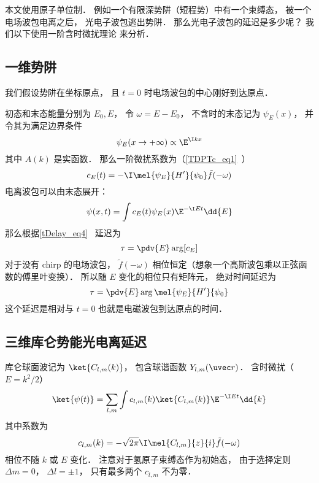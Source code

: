 
\begin{issues}
\issueDraft
\end{issues}


\begin{issues}
\issueDraft
\end{issues}


本文使用原子单位制． 例如一个有限深势阱（短程势）中有一个束缚态， 被一个电场波包电离之后， 光电子波包逃出势阱． 那么光电子波包的延迟是多少呢？ 我们以下使用一阶含时微扰理论 来分析．

\subsection{一维势阱}
我们假设势阱在坐标原点， 且 $t = 0$ 时电场波包的中心刚好到达原点．

初态和末态能量分别为 $E_0, E$， 令 $\omega = E - E_0$， 不含时的末态记为 $\psi_E(x)$， 并令其为满足边界条件
\begin{equation}\label{HeAna2_eq2}
\psi_E(x \to +\infty) \propto \E^{\I kx}
\end{equation}
其中 $A(k)$ 是实函数． 那么一阶微扰系数为（\autoref{TDPTc_eq1}~）
\begin{equation}
c_E(t) = -\I  \mel{\psi_E}{H'}{\psi_0} \tilde f(-\omega)
\end{equation}
电离波包可以由末态展开：
\begin{equation}
\psi(x, t) = \int c_E(t) \psi_E(x)\E^{-\I E t} \dd{E}
\end{equation}
那么根据\autoref{tDelay_eq4}~ 延迟为
\begin{equation}\label{HeAna2_eq3}
\tau = \pdv{E} \arg [c_E]
\end{equation}
对于没有 chirp 的电场波包， $\tilde f(-\omega)$ 相位恒定（想象一个高斯波包乘以正弦函数的傅里叶变换）． 所以随 $E$ 变化的相位只有矩阵元， 绝对时间延迟为
\begin{equation}\label{HeAna2_eq1}
\tau = \pdv{E} \arg \mel{\psi_E}{H'}{\psi_0}
\end{equation}
这个延迟是相对与 $t = 0$ 也就是电磁波包到达原点的时间．

\subsection{三维库仑势能光电离延迟}
库仑球面波记为 $\ket{C_{l,m}(k)}$， 包含球谐函数 $Y_{l,m}(\uvec r)$． 含时微扰（$E = k^2/2$）
\begin{equation}\label{HeAna2_eq4}
\ket{\psi(t)} = \sum_{l,m} \int c_{l,m}(k) \ket{C_{l,m}(k)} \E^{-\I E t} \dd{k}
\end{equation}
其中系数为
\begin{equation}
c_{l,m}(k) = -\sqrt{2\pi}\I \mel{C_{l,m}}{z}{i} \tilde f(-\omega)
\end{equation}
相位不随 $k$ 或 $E$ 变化． 注意对于氢原子束缚态作为初始态， 由于选择定则 $\Delta m = 0$， $\Delta l = \pm 1$， 只有最多两个 $c_{l,m}$ 不为零．


